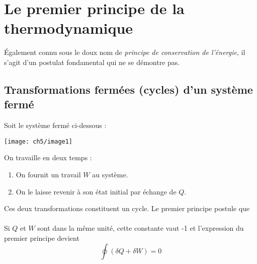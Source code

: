 \chapter{Le premier principe de la thermodynamique} 
Également connu sous le doux nom de \textit{principe de 
conservation de l'énergie}, il s'agit d'un postulat fondamental
qui ne se démontre pas.

\section{Transformations fermées (cycles) d'un système fermé}
Soit le système fermé ci-dessous :
\begin{center}
\texttt{[image: ch5/image1]}
\end{center}
On travaille en deux temps :
\begin{enumerate}
\item On fournit un travail $W$ au système.
\item On le laisse revenir à son état initial par échange de $Q$.
\end{enumerate}
Ces deux transformations constituent un cycle. Le premier principe 
postule que\\

\ \\

Si $Q$ et $W$ sont dans la même unité, cette constante vaut -1 et 
l'expression du premier principe devient
\begin{equation}
\oint (\delta Q + \delta W) = 0
\end{equation}

